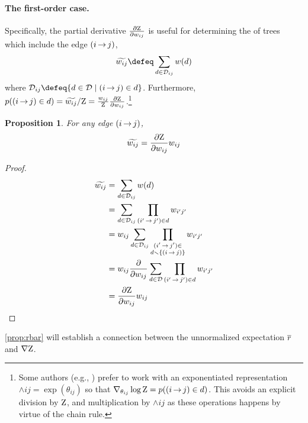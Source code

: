 \documentclass[11pt,a4paper]{article}
\newtheorem{prop}{Proposition}
\theoremstyle{definition}
\begin{document}
\paragraph{The first-order case.}
Specifically, the partial derivative $\frac{\partial {\mathrm{Z}}}{\partial {w_{ij}}}$ is useful for determining the  of trees which include the edge ${(i\,{\rightarrow}\,j)}$,
\begin{equation}
    \totalw{ij} \defeq \sum_{\tree\in\inc{ij}}\wtree{\tree}
\end{equation}
where $\inc{ij}\defeq \{ \tree \in \st \mid \edgeij \in \tree \}$.
Furthermore, $p({(i\,{\rightarrow}\,j)} \in {d}) = {\widetilde{w_{ij}}}/{\mathrm{Z}} = \frac{{w_{ij}}}{{\mathrm{Z}}} \frac{\partial {\mathrm{Z}}}{\partial {w_{ij}}}$.\footnote{Some authors (e.g., \citet{wainwright}) prefer to work with an exponentiated representation $\wedge{ij} = \exp(\theta_{ij})$ so that $\nabla_{\theta_{ij}} \log {\mathrm{Z}} = p( {(i\,{\rightarrow}\,j)} \in {d} )$.  This avoids an explicit division by ${\mathrm{Z}}$, and multiplication by $\wedge{ij}$ as these operations happens by virtue of the chain rule.}
\begin{prop}
\label{prop:first-weight} 
For any edge ${(i\,{\rightarrow}\,j)}$,
\begin{equation}\label{eq:total}
    {\widetilde{w_{ij}}}=\frac{\partial {\mathrm{Z}}}{\partial {w_{ij}}}{w_{ij}}
\end{equation}
\end{prop}
\begin{proof}
\begin{align*}
    {\widetilde{w_{ij}}} &= \sum_{{d}\in{\mathcal{D}_{ij}}}{w({d})} \\
    &= \sum_{{d}\in{\mathcal{D}_{ij}}}\prod_{{(i'\,{\rightarrow}\,j')}\in{d}}{w_{i'j'}} \\
    &= {w_{ij}} \sum_{{d}\in{\mathcal{D}_{ij}}}\prod_{\substack{{(i'\,{\rightarrow}\,j')}\in \\{d}\smallsetminus \{{(i\,{\rightarrow}\,j)}\}}}{w_{i'j'}}  \\
    &={w_{ij}} \frac{\partial}{\partial {w_{ij}}} \sum_{{d} \in {\mathcal{D}}}\prod_{{(i'\,{\rightarrow}\,j')}\in{d}} {w_{i'j'}} \\
    &= \frac{\partial {\mathrm{Z}}}{\partial {w_{ij}}} {w_{ij}}
\end{align*}
\end{proof}

\cref{prop:rbar} will establish a connection between the unnormalized expectation ${\overline{r}}$ and $\nabla{\mathrm{Z}}$.
\end{document}
